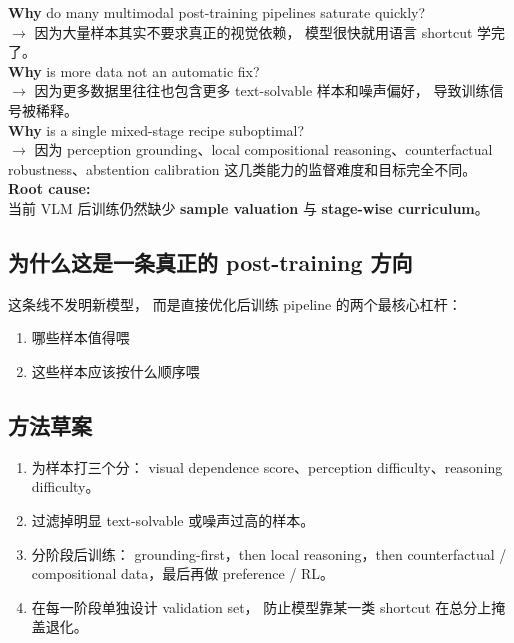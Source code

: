 \documentclass[12pt,a4paper]{article}
\begin{document}
\begin{whybox}
\textbf{Why} do many multimodal post-training pipelines saturate quickly?\\
$\rightarrow$ 因为大量样本其实不要求真正的视觉依赖，
模型很快就用语言 shortcut 学完了。\\[3pt]
\textbf{Why} is more data not an automatic fix?\\
$\rightarrow$ 因为更多数据里往往也包含更多 text-solvable 样本和噪声偏好，
导致训练信号被稀释。\\[3pt]
\textbf{Why} is a single mixed-stage recipe suboptimal?\\
$\rightarrow$ 因为 perception grounding、local compositional reasoning、counterfactual robustness、abstention calibration
这几类能力的监督难度和目标完全不同。\\[3pt]
\textbf{Root cause:}\\
当前 VLM 后训练仍然缺少 \textbf{sample valuation} 与 \textbf{stage-wise curriculum}。
\end{whybox}

\subsection{为什么这是一条真正的 post-training 方向}

这条线不发明新模型，
而是直接优化后训练 pipeline 的两个最核心杠杆：
\begin{enumerate}[leftmargin=2em]
  \item 哪些样本值得喂
  \item 这些样本应该按什么顺序喂
\end{enumerate}

\subsection{方法草案}

\begin{enumerate}[leftmargin=2em]
  \item 为样本打三个分：
    visual dependence score、perception difficulty、reasoning difficulty。
  \item 过滤掉明显 text-solvable 或噪声过高的样本。
  \item 分阶段后训练：
    grounding-first，then local reasoning，then counterfactual / compositional data，最后再做 preference / RL。
  \item 在每一阶段单独设计 validation set，
    防止模型靠某一类 shortcut 在总分上掩盖退化。
\end{enumerate}
\end{document}
